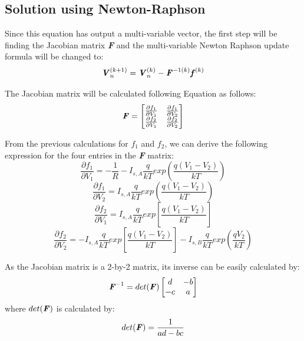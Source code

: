\documentclass[a4paper,titlepage]{article}
\begin{document}
		\subsection{Solution using Newton-Raphson}
			Since this equation has output a multi-variable vector, the first step will be finding the Jacobian matrix \textbf{\textit{F}} and the multi-variable Newton Raphson update formula will be changed to:
			$$
				\textbf{\textit{V}}_n^{(k + 1)} = \textbf{\textit{V}}_n^{(k)} - \textbf{\textit{F}}^{-1(k)}\textbf{\textit{f}}^{(k)}
			$$
			
			The Jacobian matrix will be calculated following Equation as follows:
			\begin{equation}
				\textbf{\textit{F}} = \begin{bmatrix}
					\frac{\partial f_1}{\partial V_1} & \frac{\partial f_1}{\partial V_2} \\
					\frac{\partial f_2}{\partial V_1} & \frac{\partial f_2}{\partial V_2}
				\end{bmatrix}
			\end{equation}
			
			From the previous calculations for $f_1$ and $f_2$, we can derive the following expression for the four entries in the \textbf{\textit{F}} matrix:
			$$
				\frac{\partial f_1}{\partial V_1} = -\frac{1}{R} - I_{s, A}\frac{q}{kT}exp(\frac{q(V_1 - V_2)}{kT})
			$$
			$$
				\frac{\partial f_1}{\partial V_2} = I_{s,A}\frac{q}{kT}exp(\frac{q(V_1 - V_2)}{kT})
			$$
			$$
				\frac{\partial f_2}{\partial V_1} = I_{s,A}\frac{q}{kT}exp[\frac{q(V_1 - V_2)}{kT}]
			$$
			$$
				\frac{\partial f_2}{\partial V_2} = -I_{s, A}\frac{q}{kT}exp[\frac{q(V_1 - V_2)}{kT}] - I_{s, B}\frac{q}{kT}exp(\frac{qV_2}{kT})
			$$
			
			As the Jacobian matrix is a 2-by-2 matrix, its inverse can be easily calculated by:
			\begin{equation}
				\textbf{\textit{F}}^{-1} = det(\textbf{\textit{F}})\begin{bmatrix}
					d & -b \\
					-c & a
				\end{bmatrix}
			\end{equation}
			where $det(\textbf{\textit{F}})$ is calculated by:
			$$
				det(\textbf{\textit{F}}) = \frac{1}{ad - bc}
			$$
		
\end{document}
